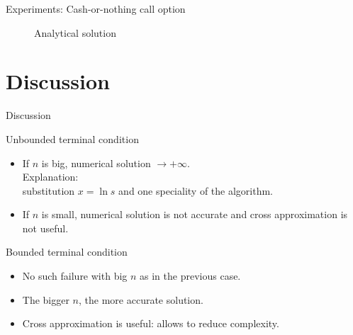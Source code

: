 \documentclass{beamer}
\theoremstyle{definition}
\theoremstyle{plain}
\theoremstyle{remark}
\begin{document}
\begin{frame}{Experiments: Cash-or-nothing call option}
\begin{minipage}{\linewidth}
\begin{minipage}{0.45\linewidth}
\begin{figure}[H]
              \caption{Analytical solution}
          \end{figure}
      \end{minipage}
  \end{minipage}	 	 
		\end{frame}
		
	\section{Discussion}

		\begin{frame}{Discussion}
			\vspace{-7pt}
			\begin{block}{Unbounded terminal condition}
				\begin{itemize}
					\item If $n$ is big, numerical solution $\rightarrow +\infty$.\\
					Explanation: \\substitution $x = \ln s$ and one speciality of the algorithm.
					\item If $n$ is small, numerical solution is not accurate and cross approximation is not useful.
				\end{itemize}
			\end{block}
			\vspace{-3pt}
			\begin{block}{Bounded terminal condition}
				\begin{itemize}
					\item No such failure with big $n$ as in the previous case.
					\item The bigger $n$, the more accurate solution.
					\item Cross approximation is useful: allows to reduce complexity.
				\end{itemize}
			\end{block}
		\end{frame}
	
	\section*{}

		\begin{frame}{}
		\end{frame}
\end{document}
